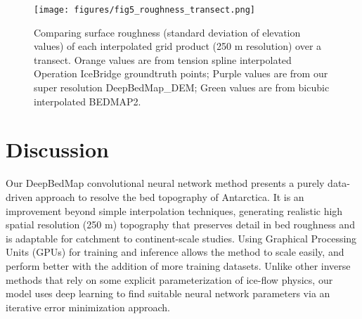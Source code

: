 \documentclass[tc, manuscript]{copernicus}
\begin{document}
\begin{figure*}[ht]
  \centering
  \qquad
  \caption{
    Spatial 2D view of grids over Thwaites Glacier, West Antarctica.
    Plotted on an Antarctic Stereographic Projection (EPSG:3031) with elevation and standard deviation values in metres referenced to the WGS84 datum.
    Orange groundtruth points in \textbf{a} correspond to transect sampling locations used in Figure \ref{fig:5}.
    Note that color scale of \textbf{b} and \textbf{c} is twice that of \textbf{d}.
  }
  \label{fig:4}
\end{figure*}

\begin{figure}[ht]
    \texttt{[image: figures/fig5\_roughness\_transect.png]}
    \caption{
      Comparing surface roughness (standard deviation of elevation values) of each interpolated grid product (250 m resolution) over a transect.
      Orange values are from tension spline interpolated Operation IceBridge groundtruth points;
      Purple values are from our super resolution DeepBedMap\_DEM;
      Green values are from bicubic interpolated BEDMAP2.
    }
    \label{fig:5}
\end{figure}


\section{Discussion}

Our DeepBedMap convolutional neural network method presents a purely data-driven approach to resolve the bed topography of Antarctica.
It is an improvement beyond simple interpolation techniques, generating realistic high spatial resolution (250 m) topography that preserves detail in bed roughness and is adaptable for catchment to continent-scale studies.
Using Graphical Processing Units (GPUs) for training and inference allows the method to scale easily, and perform better with the addition of more training datasets.
Unlike other inverse methods that rely on some explicit parameterization of ice-flow physics, our model uses deep learning to find suitable neural network parameters via an iterative error minimization approach.
\end{document}
